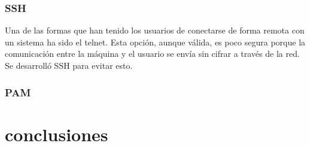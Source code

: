 \documentclass[titlepage, 12pt, a4paper]{article}
\begin{document}
\subsubsection{\Gls{SSH}}
Una de las formas que han tenido los usuarios de conectarse de forma remota con un sistema ha sido el \Gls{telnet}. Esta opción, aunque válida, es poco segura porque la comunicación entre la máquina y el usuario se envía sin cifrar a través de la red.\\Se desarrolló SSH para evitar esto.

\subsubsection{\Gls{PAM}}
\section{conclusiones}
\clearpage
\printbibliography[heading=bibintoc,title={Bibliografía}]
\end{document}
